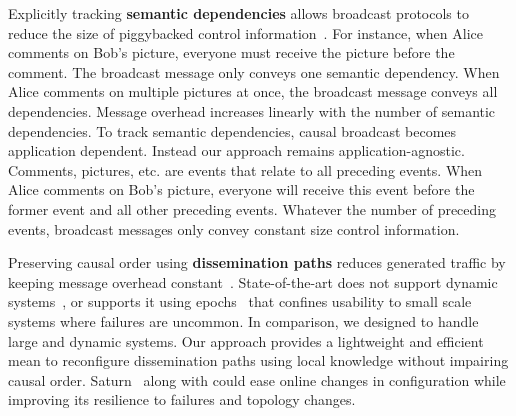 \noindent Explicitly tracking \textbf{semantic dependencies} allows broadcast
protocols to reduce the size of piggybacked control
information~\cite{bailis2013bolton,lloyd2011cops,mukund2014optimized}. For
instance, when Alice comments on Bob's picture, everyone must receive the picture
before the comment. The broadcast message only conveys one semantic
dependency. When Alice comments on multiple pictures at once, the broadcast message
conveys all dependencies.  Message overhead increases linearly with the number
of semantic dependencies. To track semantic dependencies, causal broadcast
becomes application dependent. Instead our approach remains
application-agnostic. Comments, pictures, etc. are events that relate to all
preceding events. When Alice comments on Bob's picture, everyone will receive this
event before the former event and all other preceding events. Whatever the
number of preceding events, broadcast messages only convey constant size control
information.

\noindent Preserving causal order using \textbf{dissemination paths} reduces
generated traffic by keeping message overhead
constant~\cite{bravo2017saturn,friedman2004causal}. State-of-the-art does not
support dynamic systems~\cite{friedman2004causal}, or supports it using
epochs~\cite{bravo2017saturn} that confines usability to small scale systems
where failures are uncommon. In comparison, we designed \CBROADCAST to handle
large and dynamic systems. Our approach provides a lightweight and efficient
mean to reconfigure dissemination paths using local knowledge without impairing
causal order.  Saturn~\cite{bravo2017saturn} along with \CBROADCAST could ease
online changes in configuration while improving its resilience to failures and topology
changes.




